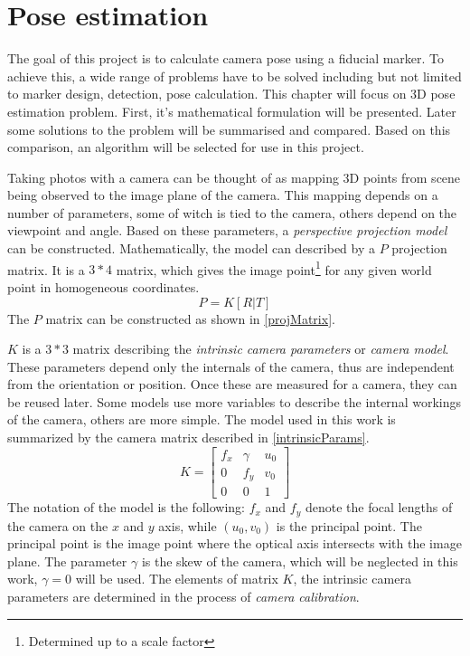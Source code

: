 \chapter{Pose estimation}\label{sect:pose}

The goal of this project is to calculate camera pose using a fiducial marker.
To achieve this, a wide range of problems have to be solved including but not limited to marker design, detection, pose calculation.
This chapter will focus on 3D pose estimation problem.
First, it's mathematical formulation will be presented.
Later some solutions to the problem will be summarised and compared.
Based on this comparison, an algorithm will be selected for use in this project.

Taking photos with a camera can be thought of as mapping 3D points from scene being observed to the image plane of the camera.
This mapping depends on a number of parameters, some of witch is tied to the camera, others depend on the viewpoint and angle.
Based on these parameters, a \textit{perspective projection model} can be constructed.
Mathematically, the model can described by a $P$ projection matrix.
It is a $3*4$ matrix, which gives the image point\footnote{Determined up to a scale factor} for any given world point in homogeneous coordinates.
\begin{equation}
	P = K [R|T]
	\label{eq:projMatrix}
\end{equation}
The $P$ matrix can be constructed as shown in \eqref{projMatrix}.

$K$ is a $3*3$ matrix describing the \textit{intrinsic camera parameters} or \textit{camera model}.
These parameters depend only the internals of the camera, thus are independent from the orientation or position.
Once these are measured for a camera, they can be reused later.
Some models use more variables to describe the internal workings of the camera, others are more simple.
The model used in this work is summarized by the camera matrix described in \eqref{intrinsicParams}.
\begin{equation}
	K =
	\begin{bmatrix}
		f_x & \gamma & u_0 \\
		0   & f_y    & v_0 \\
		0   & 0      & 1
	\end{bmatrix}
	\label{eq:intrinsicParams}
\end{equation}
The notation of the model is the following: $f_x$ and $f_y$ denote the focal lengths of the camera on the $x$ and $y$ axis, while $(u_0,v_0)$ is the principal point.
The principal point is the image point where the optical axis intersects with the image plane.
The parameter $\gamma$ is the skew of the camera, which will be neglected in this work, $\gamma = 0$ will be used.
The elements of matrix $K$, the intrinsic camera parameters are determined in the process of \textit{camera calibration}.

